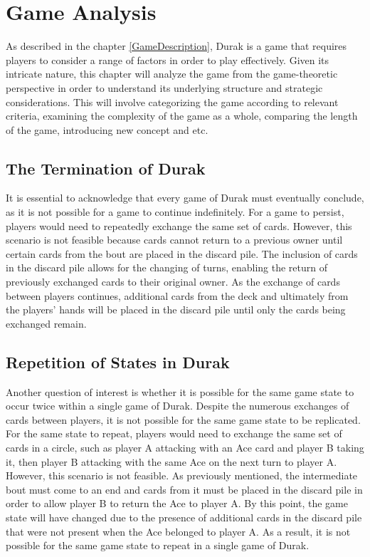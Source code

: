 \chapter{Game Analysis}

As described in the chapter \ref{GameDescription}, Durak is a game that requires players to consider a range of factors in order to play effectively. Given its intricate nature, this chapter will analyze the game from the game-theoretic perspective in order to understand its underlying structure and strategic considerations. This will involve categorizing the game according to relevant criteria, examining the complexity of the game as a whole, comparing the length of the game, introducing new concept and etc.

\section{The Termination of Durak}
It is essential to acknowledge that every game of Durak must eventually conclude, as it is not possible for a game to continue indefinitely. For a game to persist, players would need to repeatedly exchange the same set of cards. However, this scenario is not feasible because cards cannot return to a previous owner until certain cards from the bout are placed in the discard pile. The inclusion of cards in the discard pile allows for the changing of turns, enabling the return of previously exchanged cards to their original owner. As the exchange of cards between players continues, additional cards from the deck and ultimately from the players' hands will be placed in the discard pile until only the cards being exchanged remain.

\section{Repetition of States in Durak}
Another question of interest is whether it is possible for the same game state to occur twice within a single game of Durak. Despite the numerous exchanges of cards between players, it is not possible for the same game state to be replicated. For the same state to repeat, players would need to exchange the same set of cards in a circle, such as player A attacking with an Ace card and player B taking it, then player B attacking with the same Ace on the next turn to player A. However, this scenario is not feasible. As previously mentioned, the intermediate bout must come to an end and cards from it must be placed in the discard pile in order to allow player B to return the Ace to player A. By this point, the game state will have changed due to the presence of additional cards in the discard pile that were not present when the Ace belonged to player A. As a result, it is not possible for the same game state to repeat in a single game of Durak.

